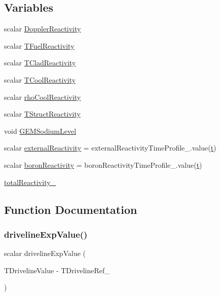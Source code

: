 \subsection*{Variables}
\begin{DoxyCompactItemize}
\item 
scalar \hyperlink{correctReactivity_8H_a97ec3a97197bf7af2871ff8259a115cb}{Doppler\+Reactivity}
\item 
scalar \hyperlink{correctReactivity_8H_ac279a1e670b326f29df719fce851db8b}{T\+Fuel\+Reactivity}
\item 
scalar \hyperlink{correctReactivity_8H_a7383c4c5d0651354b624fec6754739a7}{T\+Clad\+Reactivity}
\item 
scalar \hyperlink{correctReactivity_8H_a2f8900e0caab4a682522f17af1ec8c1d}{T\+Cool\+Reactivity}
\item 
scalar \hyperlink{correctReactivity_8H_ad58b239c992acdaf252773123854e721}{rho\+Cool\+Reactivity}
\item 
scalar \hyperlink{correctReactivity_8H_ac012a5ef75a40fa44a9cf33c92481b1a}{T\+Struct\+Reactivity}
\item 
void \hyperlink{correctReactivity_8H_ada688315955c2733c6208ecefdd38475}{G\+E\+M\+Sodium\+Level}
\item 
scalar \hyperlink{correctReactivity_8H_a49d2206965ac3f071748e09ceea41464}{external\+Reactivity} = external\+Reactivity\+Time\+Profile\+\_\+.\+value(\hyperlink{correctReactivity_8H_af8e30ff2e3fe21800ba55c8d7534a828}{t})
\item 
scalar \hyperlink{correctReactivity_8H_a504c6e003816d4907d35ee2d84317aaa}{boron\+Reactivity} = boron\+Reactivity\+Time\+Profile\+\_\+.\+value(\hyperlink{correctReactivity_8H_af8e30ff2e3fe21800ba55c8d7534a828}{t})
\item 
\hyperlink{correctReactivity_8H_a7bbab844c16aceff17e70128b5c0e13e}{total\+Reactivity\+\_\+}
\end{DoxyCompactItemize}


\subsection{Function Documentation}
\mbox{\label{correctReactivity_8H_ab559d19b9ac97ee32950424bbbbf953a}} 
\subsubsection{\texorpdfstring{driveline\+Exp\+Value()}{drivelineExpValue()}}
{\footnotesize\ttfamily scalar driveline\+Exp\+Value (\begin{DoxyParamCaption}\item[{coeff\+Driveline\+Exp\+\_\+ $\ast$}]{T\+Driveline\+Value -\/ T\+Driveline\+Ref\+\_\+ }\end{DoxyParamCaption})}

